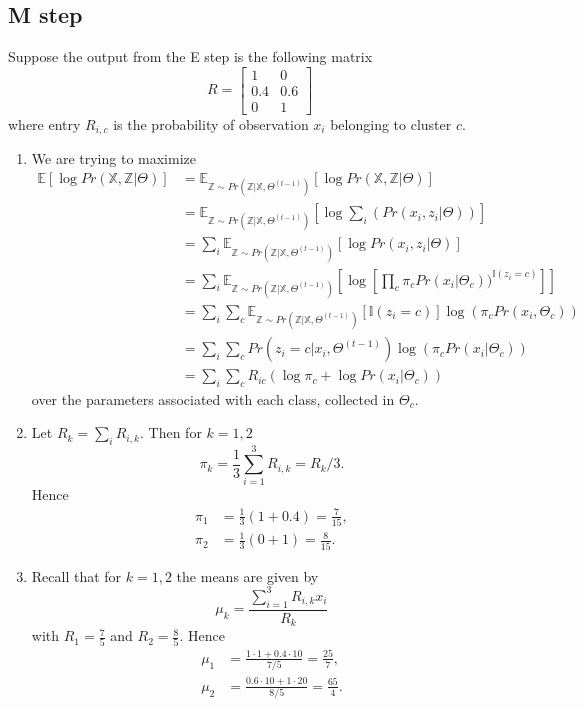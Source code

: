 \documentclass{article}
\newcommand{\bbm}{\begin{bmatrix}}
\newcommand{\ebm}{\end{bmatrix}}
\newcommand{\X}{\mathbb{X}}
\newcommand{\Z}{\mathbb{Z}}
\begin{document}
\subsection{M step}
Suppose the output from the E step is the following matrix
\[
    R = \bbm 1 & 0 \\ 0.4 &0.6 \\ 0 & 1 \ebm
\]
where entry $R_{i,c}$ is the probability of observation $x_i$ belonging to cluster $c$.
\begin{enumerate}
    \item We are trying to maximize
    \begin{align*}
        \mathbb{E}[\log Pr(\mathbb{X},\Z|\Theta)] &=\mathbb{E}_{\Z\sim Pr(\Z|\X,\Theta^{(t-1)})}\left[\log Pr(\X,\Z|\Theta) \right]\\
        &=\mathbb{E}_{\Z\sim Pr(\Z|\X,\Theta^{(t-1)})}\left[\log \sum_i\left(Pr(x_i,z_i|\Theta) \right) \right]\\
        &=\sum_i\mathbb{E}_{\Z\sim Pr(\Z|\X,\Theta^{(t-1)})}\left[ \log Pr(x_i,z_i|\Theta)\right]\\
        &=\sum_i\mathbb{E}_{\Z\sim Pr(\Z|\X,\Theta^{(t-1)})}\left[\log\left[\prod_{c} \pi_cPr(x_i|\Theta_c))^{\mathbb{I}(z_i=c)}\right]\right] \\ 
        &= \sum_i\sum_{c}\mathbb{E}_{\Z\sim Pr(\Z|\X,\Theta^{(t-1)})}[\mathbb{I}(z_i=c)]\log(\pi_c Pr(x_i,\Theta_c))\\
        &=\sum_i\sum_cPr(z_i=c|x_i,\Theta^{(t-1)})\log(\pi_cPr(x_i|\Theta_c))\\
        &= \sum_i\sum_cR_{ic}(\log\pi_c + \log Pr(x_i|\Theta_c))
    \end{align*}
    over the parameters associated with each class, collected in $\Theta_c$. 
    \item Let $R_k = \sum_i R_{i,k}$. Then for $k=1,2$
    \[
        \pi_k = \frac13\sum^3_{i=1}R_{i,k} = R_k / 3.
    \]
    Hence
    \begin{align*}
        \pi_1 &= \frac13(1+0.4)=\frac{7}{15},\\
        \pi_2 &= \frac13(0+1) = \frac{8}{15}.
    \end{align*}
    \item Recall that for $k=1,2$ the means are given by
    \[
        \mu_k = \frac{\sum_{i=1}^3R_{i,k}x_i}{R_k}
    \]
    with $R_1=\tfrac{7}{5}$ and $R_2=\tfrac{8}{5}$. Hence
    \begin{align*}
        \mu_1 &= \frac{1\cdot 1+0.4\cdot10}{7/5} = \frac{25}{7},\\
        \mu_2 &= \frac{0.6\cdot10+1\cdot20}{8/5} = \frac{65}{4}.

\end{align*}
\end{enumerate}
\end{document}
